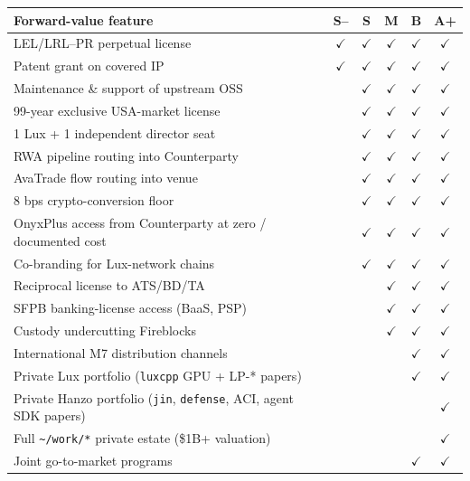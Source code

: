 \documentclass[11pt,letterpaper]{article}
\begin{document}
\begin{center}
\begin{small}
\begin{tabular}{p{6cm} ccccc}
\toprule
\textbf{Forward-value feature} & \textbf{S--} & \textbf{S} & \textbf{M} & \textbf{B} & \textbf{A+} \\
\midrule
LEL/LRL--PR perpetual license & $\checkmark$ & $\checkmark$ & $\checkmark$ & $\checkmark$ & $\checkmark$ \\
Patent grant on covered IP & $\checkmark$ & $\checkmark$ & $\checkmark$ & $\checkmark$ & $\checkmark$ \\
Maintenance \& support of upstream OSS & & $\checkmark$ & $\checkmark$ & $\checkmark$ & $\checkmark$ \\
99-year exclusive USA-market license & & $\checkmark$ & $\checkmark$ & $\checkmark$ & $\checkmark$ \\
1 Lux + 1 independent director seat & & $\checkmark$ & $\checkmark$ & $\checkmark$ & $\checkmark$ \\
RWA pipeline routing into Counterparty & & $\checkmark$ & $\checkmark$ & $\checkmark$ & $\checkmark$ \\
AvaTrade flow routing into venue & & $\checkmark$ & $\checkmark$ & $\checkmark$ & $\checkmark$ \\
8 bps crypto-conversion floor & & $\checkmark$ & $\checkmark$ & $\checkmark$ & $\checkmark$ \\
OnyxPlus access from Counterparty at zero / documented cost & & $\checkmark$ & $\checkmark$ & $\checkmark$ & $\checkmark$ \\
Co-branding for Lux-network chains & & $\checkmark$ & $\checkmark$ & $\checkmark$ & $\checkmark$ \\
Reciprocal license to ATS/BD/TA & & & $\checkmark$ & $\checkmark$ & $\checkmark$ \\
SFPB banking-license access (BaaS, PSP) & & & $\checkmark$ & $\checkmark$ & $\checkmark$ \\
Custody undercutting Fireblocks & & & $\checkmark$ & $\checkmark$ & $\checkmark$ \\
International M7 distribution channels & & & & $\checkmark$ & $\checkmark$ \\
Private Lux portfolio (\texttt{luxcpp} GPU + LP-* papers) & & & & $\checkmark$ & $\checkmark$ \\
Private Hanzo portfolio (\texttt{jin}, \texttt{defense}, ACI, agent SDK papers) & & & & & $\checkmark$ \\
Full \texttt{\textasciitilde/work/*} private estate (\$1B+ valuation) & & & & & $\checkmark$ \\
Joint go-to-market programs & & & & $\checkmark$ & $\checkmark$ \\
\bottomrule
\end{tabular}
\end{small}
\end{center}
\end{document}
